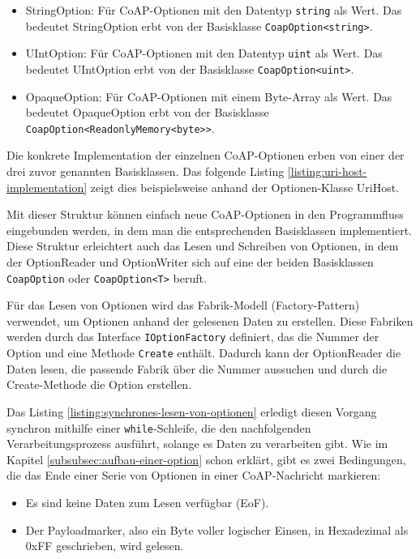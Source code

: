 \begin{itemize}
    \item StringOption: Für CoAP-Optionen mit den Datentyp \texttt{string} als Wert. Das bedeutet StringOption erbt von der Basisklasse \texttt{CoapOption<string>}.
    \item UIntOption: Für CoAP-Optionen mit den Datentyp \texttt{uint} als Wert. Das bedeutet UIntOption erbt von der Basisklasse \texttt{CoapOption<uint>}.
    \item OpaqueOption: Für CoAP-Optionen mit einem Byte-Array als Wert. Das bedeutet OpaqueOption erbt von der Basisklasse \texttt{CoapOption<ReadonlyMemory<byte>>}.
\end{itemize}

Die konkrete Implementation der einzelnen CoAP-Optionen erben von einer der drei zuvor genannten Basisklassen. Das folgende Listing \ref{listing:uri-host-implementation} zeigt dies beispielsweise anhand der Optionen-Klasse UriHost.

Mit dieser Struktur können einfach neue CoAP-Optionen in den Programmfluss eingebunden werden, in dem man die entsprechenden Basisklassen implementiert. Diese Struktur erleichtert auch das Lesen und Schreiben von Optionen, in dem der OptionReader und OptionWriter sich auf eine der beiden Basisklassen \texttt{CoapOption} oder \texttt{CoapOption<T>} beruft.

Für das Lesen von Optionen wird das Fabrik-Modell (Factory-Pattern) verwendet, um Optionen anhand der gelesenen Daten zu erstellen. Diese Fabriken werden durch das Interface \texttt{IOptionFactory} definiert, das die Nummer der Option und eine Methode \texttt{Create} enthält. Dadurch kann der OptionReader die Daten lesen, die passende Fabrik über die Nummer aussuchen und durch die Create-Methode die Option erstellen.

Das Listing \ref{listing:synchrones-lesen-von-optionen} erledigt diesen Vorgang synchron mithilfe einer \texttt{while}-Schleife, die den nachfolgenden Verarbeitungsprozess ausführt, solange es Daten zu verarbeiten gibt. Wie im Kapitel \ref{subsubsec:aufbau-einer-option} schon erklärt, gibt es zwei Bedingungen, die das Ende einer Serie von Optionen in einer CoAP-Nachricht markieren:
\begin{itemize}
    \item Es sind keine Daten zum Lesen verfügbar (EoF).
    \item Der Payloadmarker, also ein Byte voller logischer Einsen, in Hexadezimal als 0xFF geschrieben, wird gelesen.
\end{itemize}

